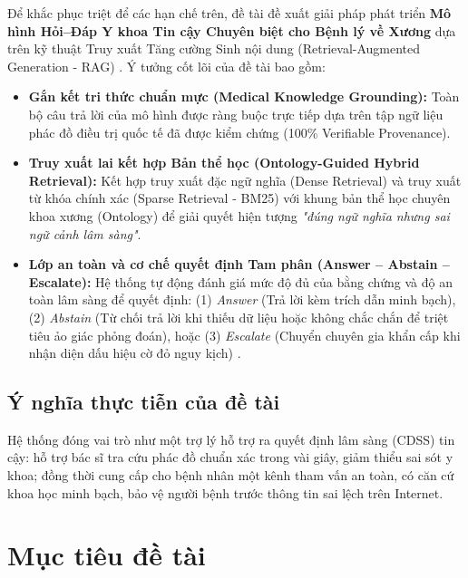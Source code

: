 \documentclass[12pt,a4paper]{article}
\begin{document}
Để khắc phục triệt để các hạn chế trên, đề tài đề xuất giải pháp phát triển \textbf{Mô hình Hỏi--Đáp Y khoa Tin cậy Chuyên biệt cho Bệnh lý về Xương} dựa trên kỹ thuật Truy xuất Tăng cường Sinh nội dung (Retrieval-Augmented Generation - RAG) \cite{lewis2020, karpukhin2020}. Ý tưởng cốt lõi của đề tài bao gồm:
\begin{itemize}[leftmargin=1.27cm]
    \item \textbf{Gắn kết tri thức chuẩn mực (Medical Knowledge Grounding):} Toàn bộ câu trả lời của mô hình được ràng buộc trực tiếp dựa trên tập ngữ liệu phác đồ điều trị quốc tế đã được kiểm chứng (100\% Verifiable Provenance).
    \item \textbf{Truy xuất lai kết hợp Bản thể học (Ontology-Guided Hybrid Retrieval):} Kết hợp truy xuất đặc ngữ nghĩa (Dense Retrieval) và truy xuất từ khóa chính xác (Sparse Retrieval - BM25) với khung bản thể học chuyên khoa xương (Ontology) để giải quyết hiện tượng \textit{"đúng ngữ nghĩa nhưng sai ngữ cảnh lâm sàng"}.
    \item \textbf{Lớp an toàn và cơ chế quyết định Tam phân (Answer -- Abstain -- Escalate):} Hệ thống tự động đánh giá mức độ đủ của bằng chứng và độ an toàn lâm sàng để quyết định: (1) \textit{Answer} (Trả lời kèm trích dẫn minh bạch), (2) \textit{Abstain} (Từ chối trả lời khi thiếu dữ liệu hoặc không chắc chắn để triệt tiêu ảo giác phỏng đoán), hoặc (3) \textit{Escalate} (Chuyển chuyên gia khẩn cấp khi nhận diện dấu hiệu cờ đỏ nguy kịch) \cite{medtrustrag}.
\end{itemize}

\subsection{Ý nghĩa thực tiễn của đề tài}
Hệ thống đóng vai trò như một trợ lý hỗ trợ ra quyết định lâm sàng (CDSS) tin cậy: hỗ trợ bác sĩ tra cứu phác đồ chuẩn xác trong vài giây, giảm thiểu sai sót y khoa; đồng thời cung cấp cho bệnh nhân một kênh tham vấn an toàn, có căn cứ khoa học minh bạch, bảo vệ người bệnh trước thông tin sai lệch trên Internet.

\section{Mục tiêu đề tài}
\end{document}
